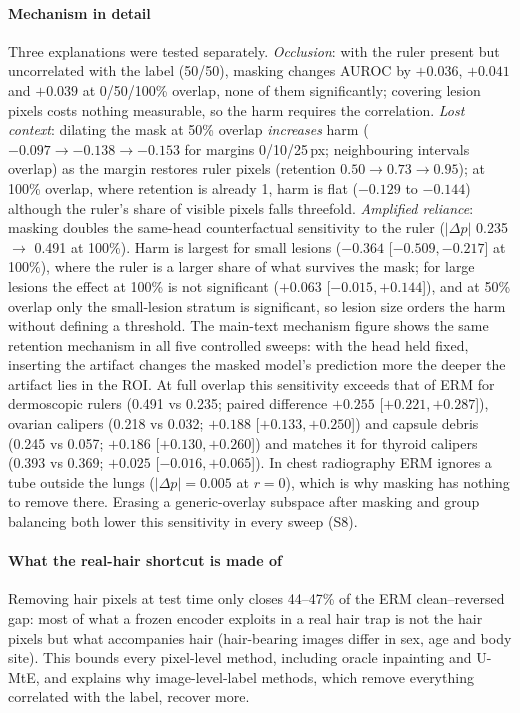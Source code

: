 \paragraph{Mechanism in detail} Three explanations were tested separately. \emph{Occlusion}: with the ruler present but uncorrelated with the
label (50/50), masking changes AUROC by $+0.036$, $+0.041$ and $+0.039$ at 0/50/100\% overlap, none of them
significantly; covering lesion pixels costs nothing measurable, so the harm requires the correlation. \emph{Lost context}: dilating the mask at
50\% overlap \emph{increases} harm ($-0.097 \rightarrow -0.138 \rightarrow -0.153$ for margins 0/10/25\,px; neighbouring
intervals overlap) as the
margin restores ruler pixels (retention $0.50 \rightarrow 0.73 \rightarrow 0.95$); at 100\% overlap, where retention
is already 1, harm is flat ($-0.129$ to $-0.144$) although the ruler's share of visible pixels falls threefold.
\emph{Amplified reliance}: masking doubles the same-head counterfactual sensitivity to the ruler
($|\Delta p|$ 0.235 $\rightarrow$ 0.491 at 100\%). Harm is largest for small lesions ($-0.364$ [$-0.509, -0.217$] at 100\%), where the ruler is a larger share of what
survives the mask; for large lesions the effect at 100\% is not significant ($+0.063$ [$-0.015, +0.144$]), and at 50\%
overlap only the small-lesion stratum is significant, so lesion size orders the harm without defining a threshold.
The main-text mechanism figure shows the same retention mechanism in all five controlled sweeps: with the head held fixed,
inserting the artifact changes the masked model's prediction more the deeper the artifact lies in the ROI. At full
overlap this sensitivity exceeds that of ERM for dermoscopic rulers (0.491 vs 0.235; paired difference $+0.255$
[$+0.221, +0.287$]), ovarian calipers (0.218 vs 0.032; $+0.188$ [$+0.133, +0.250$]) and capsule debris (0.245 vs 0.057;
$+0.186$ [$+0.130, +0.260$]) and matches it for thyroid calipers (0.393 vs 0.369; $+0.025$ [$-0.016, +0.065$]). In chest radiography
ERM ignores a tube outside the lungs ($|\Delta p|=0.005$ at $r=0$), which is why masking has nothing to remove there.
Erasing a generic-overlay subspace after masking and group balancing both lower this sensitivity in every sweep
(S8).

\paragraph{What the real-hair shortcut is made of}
Removing hair pixels at test time only closes 44--47\% of the ERM clean--reversed gap: most of what a frozen
encoder exploits in a real hair trap is not the hair pixels but what accompanies hair (hair-bearing images differ in
sex, age and body site). This bounds every pixel-level method, including oracle inpainting and U-MtE, and
explains why image-level-label methods, which remove everything correlated with the label, recover more.

